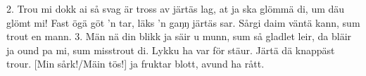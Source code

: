 2.  Trou mi dokk ai så svag
    är tross av järtäs lag,
    at ja ska glömmä di, um däu glömt mi!
    Fast ögä göt ’n tar, läks ’n gaŋŋ järtäs sar.
    Sårgi daim väntä kann, sum trout en mann.
3.  Män nä din blikk ja säir
    u munn, sum så gladlet leir,
    da bläir ja ound pa mi, sum misstrout di.
    Lykku ha var för stäur. Järtä dä knappäst trour.
    [Min sårk!/Mäin tös!] ja fruktar blott, avund ha rått.
